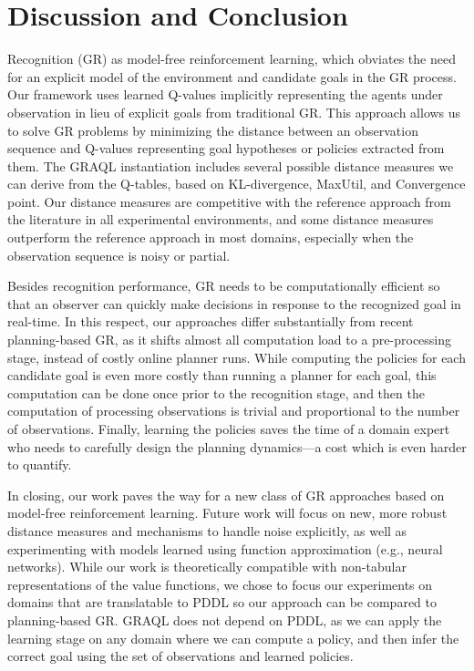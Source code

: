 \documentclass[letterpaper]{article} %
\begin{document}
\section{Discussion and Conclusion}
\label{sec:discussion}
 Recognition (GR) as model-free reinforcement learning, which obviates the need for an explicit model of the environment and candidate goals in the GR process.
Our framework uses learned Q-values implicitly representing the agents under observation in lieu of explicit goals from traditional GR.
This approach allows us to solve GR problems by minimizing the distance between an
observation sequence and Q-values representing goal hypotheses or policies extracted from them.
The GRAQL instantiation includes several possible distance measures we can derive from the Q-tables, based on KL-divergence, MaxUtil, and Convergence point. %
Our distance measures are competitive with the reference approach from the literature \cite{ramirez2009plan} in all experimental environments, and some distance measures outperform the reference approach in most domains, especially when the observation sequence is noisy or partial.

Besides recognition performance, GR needs to be computationally efficient so that an observer can quickly make decisions in response to the recognized goal in real-time.
In this respect, our approaches differ substantially from recent planning-based GR, as it shifts almost all computation load to a pre-processing stage, instead of costly online planner runs.
While computing the policies for each candidate goal is even more costly than running a planner for each goal, this computation can be done once prior to the recognition stage, and then the computation of processing observations is trivial and proportional to the number of observations.
Finally, learning the policies saves the time of a domain expert who needs to carefully design the planning dynamics---a cost which is even harder to quantify.

In closing, our work paves the way for a new class of GR approaches based on model-free reinforcement learning.
Future work will focus on new, more robust distance measures and mechanisms to handle noise explicitly, as well as experimenting with models learned using function approximation (e.g., neural networks).
While our work is theoretically compatible with non-tabular representations of the value functions, we chose to focus our experiments on domains that are translatable to PDDL so our approach can be compared to planning-based GR.
GRAQL does not depend on PDDL, as we can apply the learning stage on any domain where we can compute a policy, and then infer the correct goal using the set of observations and learned policies.
\end{document}
